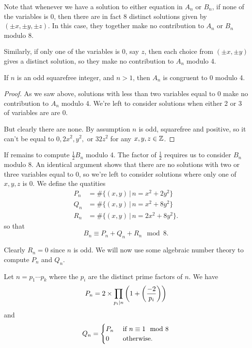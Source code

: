 \documentclass[12pt, a4paper]{amsart}
\begin{document}
Note that whenever we have a solution to either equation in $A_n$ or $B_n$,
if none of the variables is 0, then there are in fact 8 distinct
solutions given by $(\pm x, \pm y, \pm z)$.
In this case, they together make no contribution to $A_n$ or $B_n$ modulo 8.

Similarly, if only one of the variables is 0, say $z$, then each choice from
$(\pm x, \pm y)$ gives a distinct solution, so they make no contribution
to $A_n$ modulo 4.

\begin{lemma}
  If $n$ is an odd squarefree integer, and $n > 1$,
  then $A_n$ is congruent to 0 modulo 4.
\end{lemma}
\begin{proof}
  As we saw above, solutions with less than two variables equal to 0 make no
  contribution to $A_n$ modulo 4. We're left to consider solutions when
  either 2 or 3 of variables are are 0.

  But clearly there are none. By assumption $n$ is odd, squarefree and
  positive, so it can't be equal to $0, 2x^2, y^2, $ or $32z^2$ for
  any $x,y,z \in {\mathbb Z}$.
\end{proof}

If remains to compute $\frac{1}{2}B_n$ modulo 4. The factor of $\frac{1}{2}$
requires us to consider $B_n$ modulo 8.
An identical argument shows that there are no solutions with two or three
variables
equal to 0, so
we're left to consider solutions where only one of $x,y,z$ is 0.
We define the quatities
\[
  \begin{split}
    P_n &= \#\{(x,y) \,|\, n = x^2 + 2y^2\} \\
    Q_n &= \#\{(x,y) \,|\, n = x^2 + 8y^2\} \\
    R_n &= \#\{(x,y) \,|\, n = 2x^2 + 8y^2\}.
  \end{split}
\]
so that
\[
  B_n \equiv P_n + Q_n + R_n \mod{8}.
\]

Clearly $R_n = 0$ since $n$ is odd. We will now use some algebraic number theory
to compute $P_n$ and $Q_n$.

\begin{thm} \label{coeff_formula}
  Let $n = p_1 \cdots p_k$ where the $p_i$ are the distinct prime factors of
  $n$. We have
  \[P_n = 2 \times \prod\limits_{p_i \mid n} \left( 1+ \left(\frac{-2}{p_i}\right) \right)\]
  and
  \[ Q_n =
    \begin{cases}
      P_n &\text{ if } n \equiv 1 \mod{8} \\
      0 &\textnormal{ otherwise.}
    \end{cases}
  \]
\end{thm}
\end{document}
